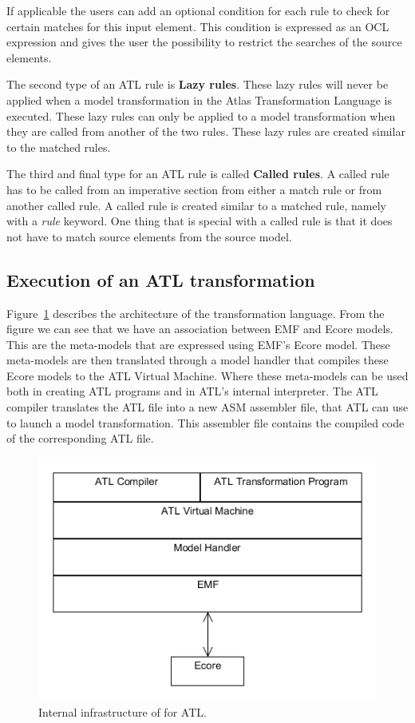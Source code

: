 If applicable the users can add an optional condition for each rule to check for
certain matches for this input element. This condition is expressed as an OCL
expression and gives the user the possibility to restrict the searches of the
source elements. 

The second type of an ATL rule is \textbf{Lazy rules}. These lazy rules will
never be applied when a model transformation in the Atlas Transformation
Language is executed. These lazy rules can only be applied to a model
transformation when they are called from another of the two rules. These lazy
rules are created similar to the matched rules.

The third and final type for an ATL rule is called \textbf{Called rules}. A
called rule has to be called from an imperative section from either a match rule or
from another called rule. A called rule is created similar to a matched rule,
namely with a \textit{rule} keyword. One thing that is special with a called
rule is that it does not have to match source elements from the source model.

\subsection{Execution of an ATL transformation}

Figure~\ref{fig:ATL_Execution} describes the architecture of the transformation
language. From the figure we can see that we have an association between EMF and
Ecore models. This are the meta-models that are expressed using EMF's Ecore
model. These meta-models are then translated through a model handler that
compiles these Ecore models to the ATL Virtual Machine. Where these meta-models
can be used both in creating ATL programs and in ATL's internal interpreter. The
ATL compiler translates the ATL file into a new ASM assembler file, that ATL can
use to launch a model transformation. This assembler file contains the
compiled code of the corresponding ATL file.

\begin{figure}[H]
	\centering
	\includegraphics[scale=0.6]{figures/ATL_Execution.png}
	\caption[Internal infrastructure for ATL]
	{Internal infrastructure of for ATL.}
	\label{fig:ATL_Execution}
\end{figure}

